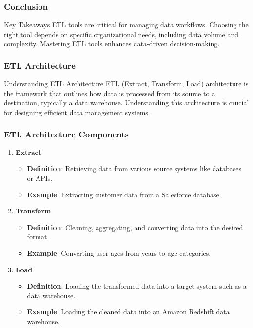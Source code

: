 \documentclass[aspectratio=169]{beamer}
\begin{document}
\begin{frame}[fragile]
    \frametitle{Conclusion}
    \begin{block}{Key Takeaways}
        ETL tools are critical for managing data workflows. Choosing the right tool depends on specific organizational needs, including data volume and complexity. Mastering ETL tools enhances data-driven decision-making.
    \end{block}
\end{frame}

\begin{frame}[fragile]
    \frametitle{ETL Architecture}
    \begin{block}{Understanding ETL Architecture}
        ETL (Extract, Transform, Load) architecture is the framework that outlines how data is processed from its source to a destination, typically a data warehouse. Understanding this architecture is crucial for designing efficient data management systems.
    \end{block}
\end{frame}

\begin{frame}[fragile]
    \frametitle{ETL Architecture Components}
    \begin{enumerate}
        \item \textbf{Extract}
        \begin{itemize}
            \item \textbf{Definition}: Retrieving data from various source systems like databases or APIs.
            \item \textbf{Example}: Extracting customer data from a Salesforce database.
        \end{itemize}
        
        \item \textbf{Transform}
        \begin{itemize}
            \item \textbf{Definition}: Cleaning, aggregating, and converting data into the desired format.
            \item \textbf{Example}: Converting user ages from years to age categories.
        \end{itemize}

        \item \textbf{Load}
        \begin{itemize}
            \item \textbf{Definition}: Loading the transformed data into a target system such as a data warehouse.
            \item \textbf{Example}: Loading the cleaned data into an Amazon Redshift data warehouse.
        \end{itemize}
    \end{enumerate}
\end{frame}
\end{document}
